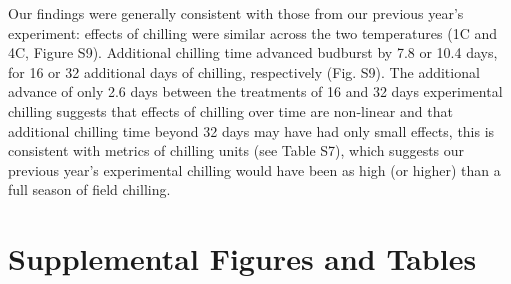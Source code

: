 \documentclass{article}
\begin{document}
\noindent Our findings were generally consistent with those from our previous year's experiment: effects of chilling were similar across the two temperatures (1\degree C and 4\degree C, Figure S9). Additional chilling time advanced budburst by 7.8 or 10.4 days, for 16 or 32 additional days of chilling, respectively (Fig. S9). The additional advance of only 2.6 days between the treatments of 16 and 32 days experimental chilling suggests that effects of chilling over time are non-linear and that additional chilling time beyond 32 days may have had only small effects, this is consistent with metrics of chilling units (see Table S7), which suggests our previous year's experimental chilling would have been as high (or higher) than a full season of field chilling. 







\newpage
\section*{Supplemental Figures and Tables}
\end{document}
